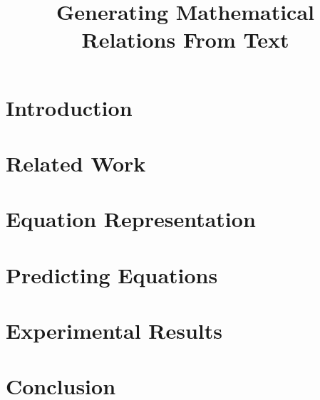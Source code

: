 
\title{Generating Mathematical Relations From Text}


\date{}


\maketitle
\begin{abstract}

\end{abstract}

\section{Introduction}


\section{Related Work}


\section{Equation Representation}


\section{Predicting Equations}


\section{Experimental Results}


\section{Conclusion}






